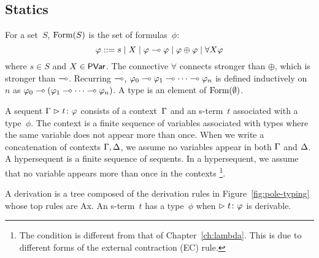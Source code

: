 

\subsection{Statics}
For a set~$S$,
$\mathop{\text{Form}}(S)$ is the set of formulas~$\phi$:
\[
\varphi::= s \mid X \mid \varphi\multimap\varphi\mid \varphi\oplus\varphi\mid
\forall X \varphi
\]
where $s\in S$ and $X\in \mathsf{PVar}$.
The connective $\forall$ connects stronger than $\oplus$, which is
stronger than $\multimap$.
Recurring $\multimap$,
$\varphi_0\multimap\varphi_1\multimap\cdots\multimap\varphi_n$ is defined inductively on~$n$
as
$\varphi_0\multimap(\varphi_1\multimap\cdots\multimap\varphi_n)$.
A type is an element of $\mathop{\text{Form}}(\emptyset)$.

A sequent ${\Gamma}\vartriangleright{ {t} \colon{\varphi} }$ consists of a
context~$\Gamma$ and an s-term~$t$ associated with a type~$\phi$.
The context is a finite sequence of variables associated
with types where the same variable does not appear more than once.
When we write a concatenation of contexts $\Gamma,\Delta$, we assume no variables
appear in both $\Gamma$ and $\Delta$.
A hypersequent is a finite sequence of sequents.
In a hypersequent, we assume that no variable appears more than once in
the contexts%
\footnote{The condition is different from that of
Chapter~\ref{ch:lambda}.  This is due to different forms of the
external contraction (EC) rule.}.

A derivation is a tree composed of the derivation
rules in Figure~\ref{fig:pole-typing}
whose top rules are Ax.
An s-term~$t$ has a type~$\phi$ when $\vartriangleright{t} \colon{\varphi}$ is derivable.

